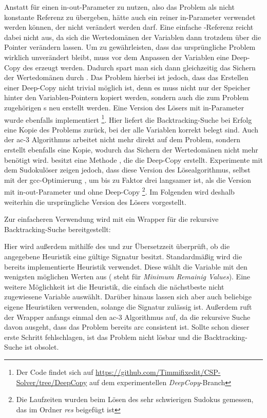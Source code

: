 Anstatt für  einen in-out-Parameter zu nutzen, also das Problem als nicht konstante Referenz zu übergeben, hätte auch ein reiner in-Parameter verwendet
werden können, der nicht verändert werden darf. Eine einfache -Referenz reicht dabei nicht aus, da sich die Wertedomänen der Variablen dann trotzdem über die
Pointer verändern lassen. Um zu gewährleisten, dass das ursprüngliche Problem wirklich unverändert bleibt, muss vor dem Anpassen der Variablen eine Deep-Copy des 
erzeugt werden. Dadurch spart man sich dann gleichzeitig das Sichern der Wertedomänen durch . Das Problem hierbei ist jedoch, dass das Erstellen einer
Deep-Copy nicht trivial möglich ist, denn es muss nicht nur der Speicher hinter den Variablen-Pointern kopiert werden, sondern auch die zum Problem zugehörigen s
neu erstellt werden. Eine Version des Lösers mit in-Parameter wurde ebenfalls implementiert \footnote{Der Code findet sich auf
\url{https://github.com/Timmifixedit/CSP-Solver/tree/DeepCopy} auf dem experimentellen \textit{DeepCopy}-Branch}. Hier liefert die Backtracking-Suche bei Erfolg eine Kopie des
Problems zurück, bei der alle Variablen korrekt belegt sind. Auch der \ac*{ac}-3 Algorithmus arbeitet nicht mehr direkt auf dem Problem, sondern erstellt ebenfalls eine Kopie,
wodurch das Sichern der Wertedomänen nicht mehr benötigt wird.  besitzt eine Methode , die die Deep-Copy erstellt. Experimente mit dem
Sudokulöser zeigen jedoch, dass diese Version des Lösealgorithmus, selbst mit der gcc-Optimierung , um bis zu Faktor drei langsamer ist, als die Version mit
in-out-Parameter und ohne Deep-Copy \footnote{Die Laufzeiten wurden beim Lösen des sehr schwierigen Sudokus gemessen, das im Ordner \textit{res} beigefügt ist}. Im Folgenden wird
deshalb weiterhin die ursprüngliche Version des Lösers vorgestellt.

Zur einfacheren Verwendung wird mit  ein Wrapper für die rekursive Backtracking-Suche bereitgestellt:

Hier wird außerdem mithilfe des  und  zur Übersetzzeit überprüft, ob die angegebene Heuristik eine gültige Signatur besitzt.
Standardmäßig wird die bereits implementierte Heuristik  verwendet. Diese wählt die Variable mit den wenigsten möglichen Werten aus ( steht
für \textit{Minimum Remainig Values}). Eine weitere Möglichkeit ist die  Heuristik, die einfach die nächstbeste nicht zugewiesene Variable auswählt.
Darüber hinaus lassen sich aber auch beliebige eigene Heuristiken verwenden, solange die Signatur zulässig ist. Außerdem ruft der Wrapper anfangs einmal den \ac*{ac}-3 Algorithmus
auf, da die rekursive Suche davon ausgeht, dass das Problem bereits arc consistent ist. Sollte schon dieser erste Schritt fehlschlagen, ist das Problem nicht lösbar und die
Backtracking-Suche ist obsolet.